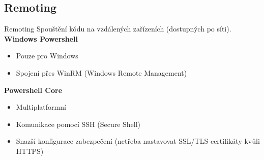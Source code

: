 \documentclass[main.tex]{subfiles}
\begin{document}
\subsection{Remoting}
\begin{frame}{Remoting}
  Spouštění kódu na vzdálených zařízeních (dostupných po síti).\\

  \textbf{Windows Powershell}
  \begin{itemize}
    \item Pouze pro Windows
    \item Spojení přes WinRM (Windows Remote Management)
  \end{itemize}
  \textbf{Powershell Core}
  \begin{itemize}
    \item Multiplatformní
    \item Komunikace pomocí SSH (Secure Shell)
    \item Snazší konfigurace zabezpečení (netřeba nastavovat SSL/TLS certifikáty kvůli HTTPS)
  \end{itemize}
\end{frame}
\end{document}
